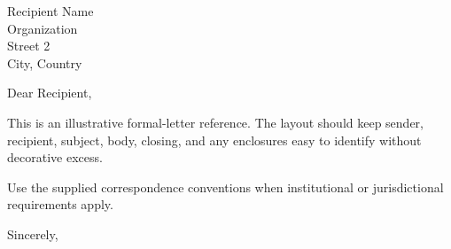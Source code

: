 \documentclass[11pt,a4paper]{scrlttr2}
\begin{document}
\begin{letter}{Recipient Name\\Organization\\Street 2\\City, Country}
\opening{Dear Recipient,}
This is an illustrative formal-letter reference. The layout should keep sender, recipient, subject,
body, closing, and any enclosures easy to identify without decorative excess.

Use the supplied correspondence conventions when institutional or jurisdictional requirements apply.
\closing{Sincerely,}
\end{letter}
\end{document}
